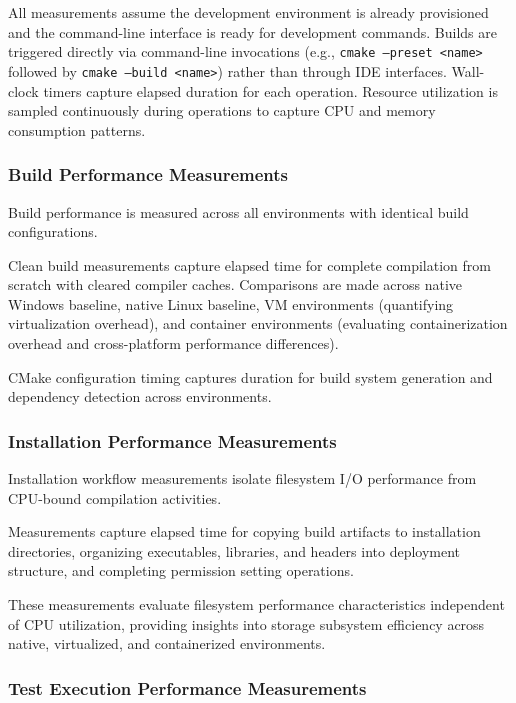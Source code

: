 All measurements assume the development environment is already provisioned and the command-line interface is ready for development commands.
Builds are triggered directly via command-line invocations (e.g., \texttt{cmake --preset <name>} followed by \texttt{cmake --build <name>}) rather than through IDE interfaces.
\mbox{Wall-clock} timers capture elapsed duration for each operation.
Resource utilization is sampled continuously during operations to capture CPU and memory consumption patterns.

\subsubsection{Build Performance Measurements}

Build performance is measured across all environments with identical build configurations.

Clean build measurements capture elapsed time for complete compilation from scratch with cleared compiler caches.
Comparisons are made across native Windows baseline, native Linux baseline, VM environments (quantifying virtualization overhead), and container environments (evaluating containerization overhead and cross-platform performance differences).

CMake configuration timing captures duration for build system generation and dependency detection across environments.

\subsubsection{Installation Performance Measurements}

Installation workflow measurements isolate filesystem I/O performance from CPU-bound compilation activities.

Measurements capture elapsed time for copying build artifacts to installation directories, organizing executables, libraries, and headers into deployment structure, and completing permission setting operations.

These measurements evaluate filesystem performance characteristics independent of CPU utilization, providing insights into storage subsystem efficiency across native, virtualized, and containerized environments.

\subsubsection{Test Execution Performance Measurements}


